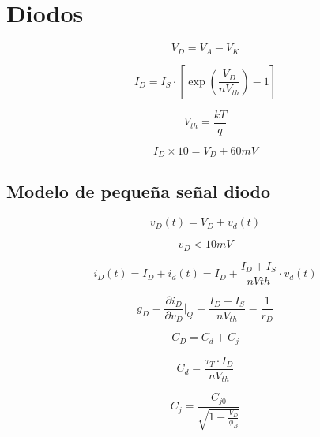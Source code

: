 \section{Diodos}

\begin{equation}
    V_D = V_A - V_K
\end{equation}

\begin{equation}
   I_D = I_S \cdot \left[\exp \left(\frac{V_D}{nV_{th}} \right)  - 1 \right]
\end{equation}

\begin{equation}
   V_{th} = \frac{kT}{q}
\end{equation}

\begin{equation}
   I_D \times 10 = V_D + 60mV
\end{equation}

\subsection{Modelo de pequeña señal diodo}
    
\begin{equation}
    v_D(t) = V_D + v_d(t)
\end{equation}

\begin{equation*}
    v_D < 10mV
\end{equation*}

\begin{equation}
    i_D(t)  = I_D + i_d(t)= I_D + \frac{I_D+I_S}{nVth} \cdot v_d(t)
\end{equation}

\begin{equation}
    g_D = \frac{\partial i_D}{\partial v_D} \Bigg|_Q = \frac{I_D + I_S}{nV_{th}} = \frac{1}{r_D}
\end{equation}

\begin{equation}
    C_D = C_{d} + C_{j}
\end{equation}

\begin{equation}
    C_{d} = \frac{\tau_T \cdot I_D}{nV_{th}}
\end{equation}

\begin{equation}
    C_{j} = \frac{C_{j0}}{\sqrt{1 - \frac{V_D}{\phi_B}}}
\end{equation}
